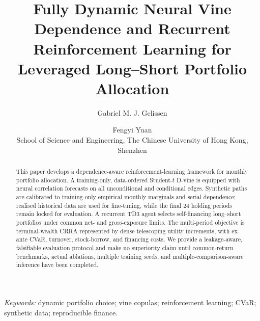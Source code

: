 \documentclass[11pt,a4paper]{article}
\title{Fully Dynamic Neural Vine Dependence and Recurrent Reinforcement Learning for Leveraged Long--Short Portfolio Allocation}
\author{Gabriel M. J. Gelissen \and Fengyi Yuan\\
School of Science and Engineering, The Chinese University of Hong Kong, Shenzhen}
\date{}
\begin{document}
\maketitle

\begin{abstract}
This paper develops a dependence-aware reinforcement-learning framework for monthly portfolio allocation. A training-only, data-ordered Student-$t$ D-vine is equipped with neural correlation forecasts on all unconditional and conditional edges. Synthetic paths are calibrated to training-only empirical monthly marginals and serial dependence; realised historical data are used for fine-tuning, while the final 24 holding periods remain locked for evaluation. A recurrent TD3 agent selects self-financing long--short portfolios under common net- and gross-exposure limits. The multi-period objective is terminal-wealth CRRA represented by dense telescoping utility increments, with ex-ante CVaR, turnover, stock-borrow, and financing costs. We provide a leakage-aware, falsifiable evaluation protocol and make no superiority claim until common-return benchmarks, actual ablations, multiple training seeds, and multiple-comparison-aware inference have been completed.
\end{abstract}

\noindent\textit{Keywords:} dynamic portfolio choice; vine copulas; reinforcement learning; CVaR; synthetic data; reproducible finance.











\end{document}
